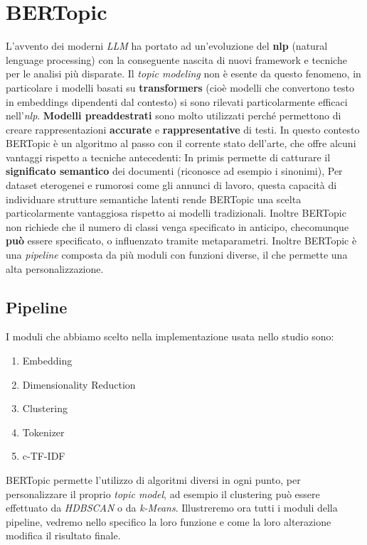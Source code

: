\chapter{BERTopic}
L'avvento dei moderni \emph{LLM} ha portato ad un'evoluzione del \textbf{nlp} (natural lenguage processing) con la conseguente nascita di nuovi framework e tecniche per le analisi più disparate.
Il \emph{topic modeling} non è esente da questo fenomeno, in particolare i modelli basati su \textbf{transformers} (cioè modelli che convertono testo in embeddings dipendenti dal contesto) si sono rilevati particolarmente efficaci nell'\emph{nlp}.
\textbf{Modelli preaddestrati} sono molto utilizzati perché permettono di creare rappresentazioni \textbf{accurate} e \textbf{rappresentative} di testi.
In questo contesto BERTopic è un algoritmo al passo con il corrente stato dell'arte, che offre alcuni vantaggi rispetto a tecniche antecedenti:
In primis permette di catturare il \textbf{significato semantico} dei documenti (riconosce ad esempio i sinonimi), Per dataset eterogenei e rumorosi come gli annunci di lavoro, questa capacità di individuare strutture semantiche latenti rende BERTopic una scelta particolarmente vantaggiosa rispetto ai modelli tradizionali. Inoltre BERTopic non richiede che il numero di classi venga specificato in anticipo, checomunque \textbf{può} essere specificato, o influenzato tramite metaparametri.
Inoltre BERTopic è una \emph{pipeline} composta da più moduli con funzioni diverse, il che permette una alta personalizzazione.

\section{Pipeline}
I moduli che abbiamo scelto nella implementazione usata nello studio sono:
\begin{enumerate}
\item Embedding
\item Dimensionality Reduction
\item Clustering
\item Tokenizer
\item c-TF-IDF
\end{enumerate}

BERTopic permette l'utilizzo di algoritmi diversi in ogni punto, per personalizzare il proprio \emph{topic model}, ad esempio il clustering può essere effettuato da \emph{HDBSCAN} o da \emph{k-Means}.
Illustreremo ora tutti i moduli della pipeline, vedremo nello specifico la loro funzione e come la loro alterazione modifica il risultato finale.
